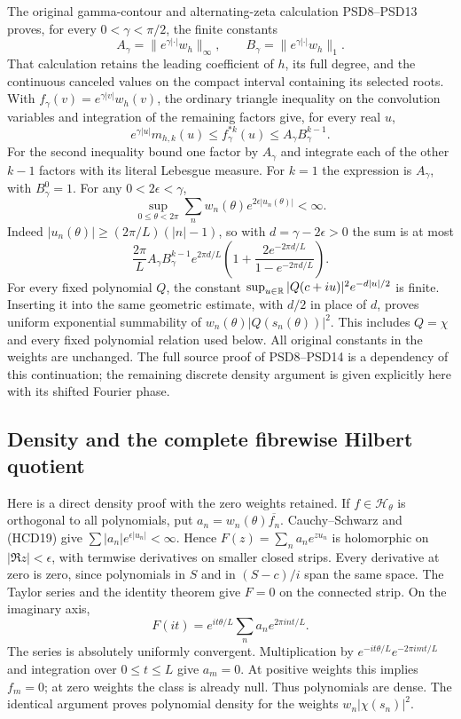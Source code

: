 The original gamma-contour and alternating-zeta calculation
PSD8--PSD13 proves, for every $0<\gamma<\pi/2$, the finite
constants
\[
 A_\gamma=\|e^{\gamma|\cdot|}w_h\|_\infty,\qquad
 B_\gamma=\|e^{\gamma|\cdot|}w_h\|_1.
\]
That calculation retains the leading coefficient of $h$,
its full degree, and the continuous canceled values on the
compact interval containing its selected roots. With
$f_\gamma(v)=e^{\gamma|v|}w_h(v)$, the ordinary triangle
inequality on the convolution variables and integration
of the remaining factors give, for every real $u$,
\[
 e^{\gamma|u|}m_{h,k}(u)
 \le f_\gamma^{*k}(u)
 \le A_\gamma B_\gamma^{k-1}.
 \tag{HCD19a}
\]
For the second inequality bound one factor by $A_\gamma$
and integrate each of the other $k-1$ factors with its
literal Lebesgue measure. For $k=1$ the expression is
$A_\gamma$, with $B_\gamma^0=1$.
For any $0<2\epsilon<\gamma$,
\[
 \sup_{0\le\theta<2\pi}
 \sum_nw_n(\theta)e^{2\epsilon|u_n(\theta)|}<\infty.
 \tag{HCD19}
\]
Indeed $|u_n(\theta)|\ge(2\pi/L)(|n|-1)$, so with
$d=\gamma-2\epsilon>0$ the sum is at most
\[
 \frac{2\pi}{L}A_\gamma B_\gamma^{k-1}
 e^{2\pi d/L}
 \left(1+\frac{2e^{-2\pi d/L}}{1-e^{-2\pi d/L}}\right).
\]
For every fixed polynomial $Q$, the constant
$\sup_{u\in\mathbb R}|Q(c+iu)|^2e^{-d|u|/2}$ is finite.
Inserting it into the same geometric estimate, with
$d/2$ in place of $d$, proves uniform exponential
summability of $w_n(\theta)|Q(s_n(\theta))|^2$.
This includes $Q=\chi$ and every fixed polynomial
relation used below. All original constants in the
weights are unchanged. The full source proof of
PSD8--PSD14 is a dependency of this continuation;
the remaining discrete density argument is given
explicitly here with its shifted Fourier phase.

\subsection{Density and the complete fibrewise Hilbert quotient}

Here is a direct density proof with the zero weights retained.
If $f\in\mathcal H_\theta$ is orthogonal to all polynomials,
put $a_n=w_n(\theta)\overline{f_n}$. Cauchy--Schwarz and
(HCD19) give $\sum|a_n|e^{\epsilon|u_n|}<\infty$.
Hence $F(z)=\sum_n a_ne^{zu_n}$ is holomorphic on
$|\Re z|<\epsilon$, with termwise derivatives on smaller
closed strips. Every derivative at zero is zero, since
polynomials in $S$ and in $(S-c)/i$ span the same space.
The Taylor series and the identity theorem give $F=0$
on the connected strip. On the imaginary axis,
\[
 F(it)=e^{it\theta/L}\sum_n a_ne^{2\pi int/L}.
\]
The series is absolutely uniformly convergent.
Multiplication by $e^{-it\theta/L}e^{-2\pi imt/L}$ and
integration over $0\le t\le L$ give $a_m=0$.
At positive weights this implies $f_m=0$; at zero weights
the class is already null. Thus polynomials are dense.
The identical argument proves polynomial density for
the weights $w_n|\chi(s_n)|^2$.

